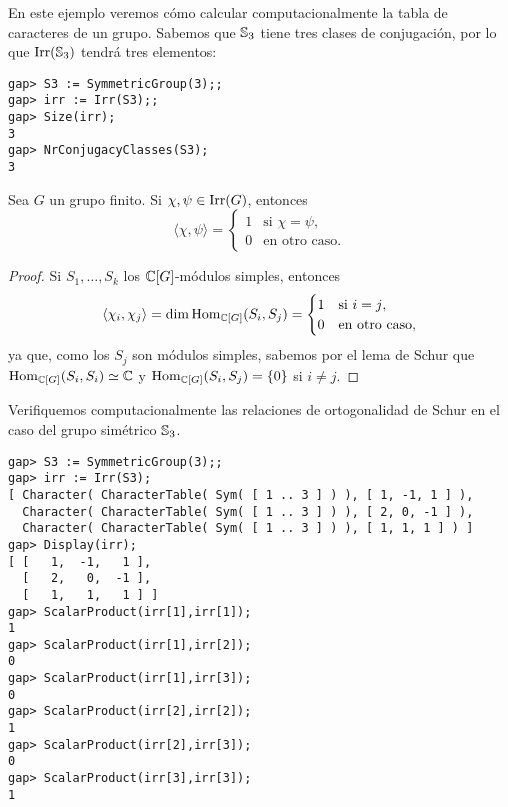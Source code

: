 \begin{example}
    En este ejemplo veremos cómo calcular computacionalmente 
    la tabla de caracteres de un grupo. Sabemos que $\mathbb{S}_3$ tiene tres clases de conjugación, por lo que
    $\operatorname{Irr}(\mathbb{S}_3)$ tendrá tres elementos:
\begin{lstlisting}
gap> S3 := SymmetricGroup(3);;
gap> irr := Irr(S3);;
gap> Size(irr);
3
gap> NrConjugacyClasses(S3);
3
\end{lstlisting}
\end{example}

\begin{theorem}[Schur]
Sea $G$ un grupo finito. 
Si $\chi,\psi\in\operatorname{Irr}(G)$, entonces 
\[
\langle\chi,\psi\rangle=\begin{cases}
1 & \text{si $\chi=\psi$},\\
0 & \text{en otro caso}.
\end{cases}
\]
\end{theorem}

\begin{proof}
Si $S_1,\dots,S_k$ los $\mathbb{C}[G]$-módulos simples, entonces
\[
\langle\chi_i,\chi_j\rangle=\dim\operatorname{Hom}_{\mathbb{C}[G]}(S_i,S_j)=
\begin{cases}
1 & \text{si $i=j$},\\
0 & \text{en otro caso},
\end{cases}
\]
ya que, como los $S_j$ son módulos simples, sabemos por el lema de Schur que 
$\operatorname{Hom}_{\mathbb{C}[G]}(S_i,S_i)\simeq\mathbb{C}$ y $\operatorname{Hom}_{\mathbb{C}[G]}(S_i,S_j)=\{0\}$ si $i\ne j$. 
\end{proof}

\begin{example}
Verifiquemos computacionalmente las relaciones de ortogonalidad 
de Schur en el caso del grupo simétrico $\mathbb{S}_3$. 
\begin{lstlisting}
gap> S3 := SymmetricGroup(3);;        
gap> irr := Irr(S3);              
[ Character( CharacterTable( Sym( [ 1 .. 3 ] ) ), [ 1, -1, 1 ] ), 
  Character( CharacterTable( Sym( [ 1 .. 3 ] ) ), [ 2, 0, -1 ] ), 
  Character( CharacterTable( Sym( [ 1 .. 3 ] ) ), [ 1, 1, 1 ] ) ]
gap> Display(irr);
[ [   1,  -1,   1 ],
  [   2,   0,  -1 ],
  [   1,   1,   1 ] ]
gap> ScalarProduct(irr[1],irr[1]);
1
gap> ScalarProduct(irr[1],irr[2]);
0
gap> ScalarProduct(irr[1],irr[3]);
0
gap> ScalarProduct(irr[2],irr[2]);
1
gap> ScalarProduct(irr[2],irr[3]);
0
gap> ScalarProduct(irr[3],irr[3]);
1

\end{lstlisting}
\end{example}

